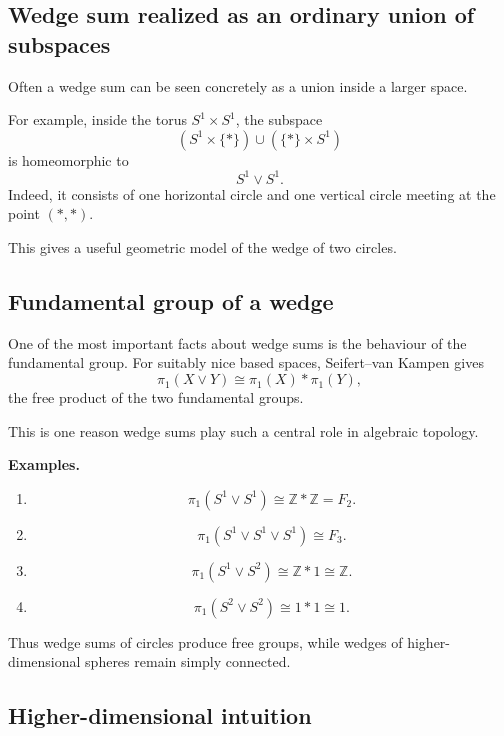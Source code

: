\documentclass[12pt,a4paper]{article}
\theoremstyle{notespace}
\begin{document}
\bigskip

\subsection{Wedge sum realized as an ordinary union of subspaces}

Often a wedge sum can be seen concretely as a union inside a larger space.

For example, inside the torus \(S^1\times S^1\), the subspace
\[
(S^1\times\{*\})\cup(\{*\}\times S^1)
\]
is homeomorphic to
\[
S^1\vee S^1.
\]
Indeed, it consists of one horizontal circle and one vertical circle meeting at the point \((*,*)\).

This gives a useful geometric model of the wedge of two circles.

\bigskip

\subsection{ Fundamental group of a wedge}

One of the most important facts about wedge sums is the behaviour of the fundamental group. For suitably nice based spaces, Seifert--van Kampen gives
\[
\pi_1(X\vee Y)\cong \pi_1(X)*\pi_1(Y),
\]
the free product of the two fundamental groups.

This is one reason wedge sums play such a central role in algebraic topology.

\medskip

\textbf{Examples.}

\begin{enumerate}
	\item
	\[
	\pi_1(S^1\vee S^1)\cong \mathbb Z * \mathbb Z = F_2.
	\]
	
	\item
	\[
	\pi_1(S^1\vee S^1\vee S^1)\cong F_3.
	\]
	
	\item
	\[
	\pi_1(S^1\vee S^2)\cong \mathbb Z*1\cong \mathbb Z.
	\]
	
	\item
	\[
	\pi_1(S^2\vee S^2)\cong 1*1\cong 1.
	\]
\end{enumerate}

Thus wedge sums of circles produce free groups, while wedges of higher-dimensional spheres remain simply connected.

\bigskip

\subsection{ Higher-dimensional intuition}
\end{document}
